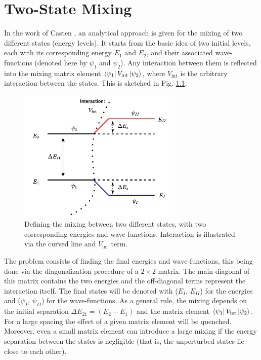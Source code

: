\chapter{Two-State Mixing}
\label{appendix:two-state}

In the work of Casten \cite{casten2000nuclear}, an analytical approach is given for the mixing of two different states (energy levels). It starts from the basic idea of two initial levels, each with its corresponding energy $E_1$ and $E_2$, and their associated wave-functions (denoted here by $\psi_1$ and $\psi_2$). Any interaction between them is reflected into the mixing matrix element $\bra{\psi_1}V_\text{int}\ket{\psi_2}$, where $V_\text{int}$ is the arbitrary interaction between the states. This is sketched in Fig. \ref{two-state-mixing-scheme}.
\begin{figure}
    \centering
    \includegraphics[width=0.7\textwidth]{Chapters/Figures/two-state-mixing.pdf}
    \caption{Defining the mixing between two different states, with two corresponding energies and wave-functions. Interaction is illustrated via the curved line and $V_\text{int}$ term.}
    \label{two-state-mixing-scheme}
\end{figure}

The problem consists of finding the final energies and wave-functions, this being done via the diagonalization procedure of a $2\times 2$ matrix. The main diagonal of this matrix contains the two energies and the off-diagonal terms represent the interaction itself. The final states will be denoted with ($E_I$, $E_{II}$) for the energies and ($\psi_I$, $\psi_{II}$) for the wave-functions. As a general rule, the mixing depends on the initial separation $\Delta E_{21}=(E_2-E_1)$ and the matrix element $\bra{\psi_1}V_\text{int}\ket{\psi_2}$. For a large spacing the effect of a given matrix element will be quenched. Moreover, even a small matrix element can introduce a large mixing if the energy separation between the states is negligible (that is, the unperturbed states lie close to each other). 

